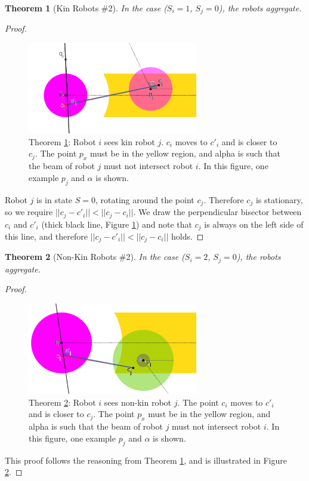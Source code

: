 \documentclass[letterpaper, 10 pt, conference]{ieeeconf}
\newtheorem{theorem}{Theorem}
\begin{document}
  \begin{theorem}[Kin Robots \#2]\label{thm:kin_2}
    In the case ($S_i=1$, $S_j=0$), the robots aggregate.
  \end{theorem}
  \begin{proof}
    \begin{figure}[t]
      \centering
      \includegraphics[height=4cm]{./images/kin_2.png}
      \caption{Theorem \ref{thm:kin_2}: Robot $i$ sees kin robot $j$. $c_i$ moves to $c'_i$ and is closer to $c_j$. The point $p_x$ must be in the yellow region, and alpha is such that the beam of robot $j$ must not intersect robot $i$. In this figure, one example $p_j$ and $\alpha$ is shown.}
      \label{fig:kin_2}
    \end{figure}

    Robot $j$ is in state $S=0$, rotating around the point $c_j$. Therefore $c_j$ is stationary, so we require $||c_j- c'_i|| < ||c_j- c_i||$. We draw the perpendicular bisector between $c_i$ and $c'_i$ (thick black line, Figure \ref{fig:kin_2}) and note that $c_j$ is always on the left side of this line, and therefore $||c_j- c'_i|| < ||c_j- c_i||$ holds.
  \end{proof}

  \begin{theorem}[Non-Kin Robots \#2]\label{thm:non_kin_2}
    In the case ($S_i=2$, $S_j=0$), the robots aggregate.
  \end{theorem}
  \begin{proof}
    \begin{figure}[t]
      \centering
      \includegraphics[height=4cm]{./images/non_kin_2.png}
      \caption{Theorem \ref{thm:non_kin_2}: Robot $i$ sees non-kin robot $j$. The point $c_i$ moves to $c'_i$ and is closer to $c_j$. The point $p_x$ must be in the yellow region, and alpha is such that the beam of robot $j$ must not intersect robot $i$. In this figure, one example $p_j$ and $\alpha$ is shown.}
      \label{fig:non_kin_2}
    \end{figure}

    This proof follows the reasoning from Theorem \ref{thm:kin_2}, and is illustrated in Figure \ref{fig:non_kin_2}.
  \end{proof}
\end{document}
